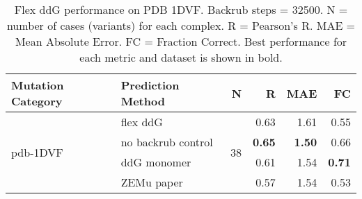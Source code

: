 \begin{table}
  \begin{tabular}{llrrrr}
\toprule
Mutation Category &   Prediction Method &   N &    R &  MAE &   FC \\
\midrule
 \multirow{ 4}{*}{pdb-1DVF} & flex ddG & \multirow{ 4}{*}{38} & 0.63 & 1.61 & 0.55  \\
 & no backrub control & & \textbf{0.65} & \textbf{1.50} & 0.66  \\
 & ddG monomer & & 0.61 & 1.54 & \textbf{0.71}  \\
 & ZEMu paper & & 0.57 & 1.54 & 0.53  \\
\bottomrule
\end{tabular}
  \caption[Flex ddG performance on PDB 1DVF]{
    Flex ddG performance on PDB 1DVF. Backrub steps = 32500. N = number of cases (variants) for each complex. R = Pearson's R. MAE = Mean Absolute Error. FC = Fraction Correct. Best performance for each metric and dataset is shown in bold.
  } \label{tab:table-pdb-1DVF}
\end{table}
